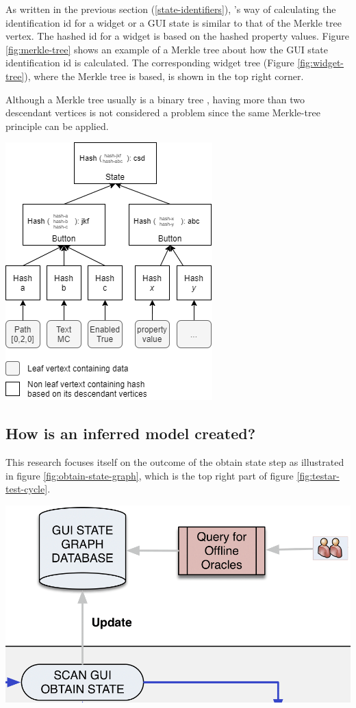As written in the previous section (\ref{state-identifiers}), \testar's way of calculating the identification id for a widget or a GUI state is similar to that of the Merkle tree vertex. The hashed id for a widget is based on the hashed property values. Figure \ref{fig:merkle-tree} shows an example of a Merkle tree about how the GUI state identification id is calculated. The corresponding widget tree (Figure \ref{fig:widget-tree}), where the Merkle tree is based, is shown in the top right corner.

Although a Merkle tree usually is a binary tree \cite{merkle-tree}, having more than two descendant vertices is not considered a problem since the same Merkle-tree principle can be applied.

\bigskip
\begingroup
\captionsetup{type=figure}
\includegraphics[scale=0.8]{images/merkle-tree-example.png}
\label{fig:merkle-tree}
\endgroup

\subsection{How is an inferred model created?}
This research focuses itself on the outcome of the obtain state step as illustrated in figure \ref{fig:obtain-state-graph}, which is the top right part of figure \ref{fig:testar-test-cycle}.

\bigskip
\begingroup
\captionsetup{type=figure}
\includegraphics[scale=0.4]{images/obtain-state-graph.png}
\label{fig:obtain-state-graph}
\endgroup

